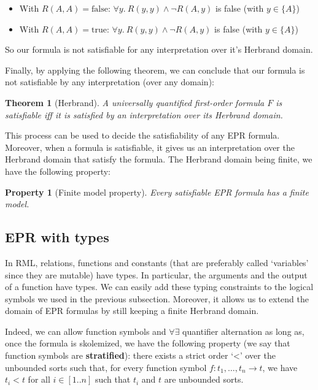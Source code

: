 \documentclass[11pt,a4paper,oldfontcommands,openany]{memoir}
\newtheorem*{theorem}{Theorem}
\newtheorem*{property}{Property}
\begin{document}
        \begin{itemize}
            \item With \(R(A,A)=\text{false}\): \(\forall y. \ R(y,y) \land \neg R(A,y)\) is false (with \( y \in \{A\} \))
            \item With \(R(A,A)=\text{true}\): \(\forall y. \ R(y,y) \land \neg R(A,y)\) is false (with \( y \in \{A\} \))
        \end{itemize}

        So our formula is not satisfiable for any interpretation over it's Herbrand domain.

        Finally, by applying the following theorem, we can conclude that our formula is not satisfiable by any interpretation (over any domain):
        \begin{theorem}[Herbrand]
            A universally quantified first-order formula \(F\) is satisfiable iff it is satisfied by an interpretation over its Herbrand domain.
        \end{theorem}

        This process can be used to decide the satisfiability of any EPR formula. Moreover, when a formula is satisfiable,
        it gives us an interpretation over the Herbrand domain that satisfy the formula.
        The Herbrand domain being finite, we have the following property:

        \begin{property}[Finite model property]
            Every satisfiable EPR formula has a finite model.
        \end{property}

        \subsection{EPR with types}

        In RML, relations, functions and constants (that are preferably called `variables' since they are mutable) have types.
        In particular, the arguments and the output of a function have types.
        We can easily add these typing constraints to the logical symbols we used in the previous subsection.
        Moreover, it allows us to extend the domain of EPR formulas by still keeping a finite Herbrand domain.

        Indeed, we can allow function symbols and \(\forall\exists\) quantifier alternation as long as,
        once the formula is skolemized, we have the following property (we say that function symbols are \textbf{stratified}):
        there exists a strict order `<' over the unbounded sorts such that,
        for every function symbol \( f: t_1,\ldots,t_n \to t \), we have \( t_i < t \) for all \(i \in [1..n]\) such that \(t_i\) and \(t\)
        are unbounded sorts. 
\end{document}
